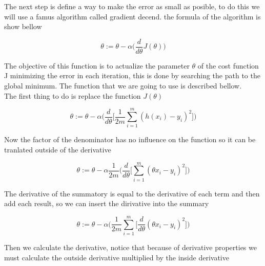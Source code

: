 \documentclass[12pt,journal]{IEEEtran}
\begin{document}
    The next step is define a way to make the error as small as posible,
    to do this we will use a famus algorithm called gradient decend.
    the formula of the algorithm is show bellow

    \begin{equation}
        \theta := \theta - \alpha
            \Bigg(
                \frac{d}{d \theta} J(\theta)
            \Bigg)
    \end{equation}

    The objective of this function is to actualize the parameter $\theta$
    of the cost function J minimizing the error in each iteration, this
    is done by searching the path to the global minimum. The function
    that we are going to use is described bellow.\\

    The first thing to do is replace the function $J(\theta)$

    \begin{equation}
        \theta := \theta - \alpha
            \Bigg(
                \frac{d}{d \theta}
                    \Bigg[
                        \frac{1}{2m} \sum_{i=1}^{m} ( h(x_i) - y_i )^2
                    \Bigg]
            \Bigg)
    \end{equation}

    Now the factor of the denominator has no influence on the function so it
    can be tranlated outside of the derivative

    \begin{equation}
        \theta := \theta - \alpha \frac{1}{2m}
            \Bigg(
                \frac{d}{d \theta}
                    \Bigg[
                        \sum_{i=1}^{m} (\theta x_i - y_i)^2
                    \Bigg]
            \Bigg)
    \end{equation}

    The derivative of the summatory is equal to the derivative of each term and
    then add each result, so we can insert the dirivative into the summary

    \begin{equation}
        \theta := \theta - \alpha
            \Bigg(
                \frac{1}{2m} \sum_{i=1}^{m}
                    \Bigg[
                        \frac{d}{d \theta} (\theta x_i - y_i)^2
                    \Bigg]
            \Bigg)
    \end{equation}

    Then we calculate the derivative, notice that because of derivative
    properties we must calculate the outside derivative multiplied by the inside
    derivative
\end{document}
